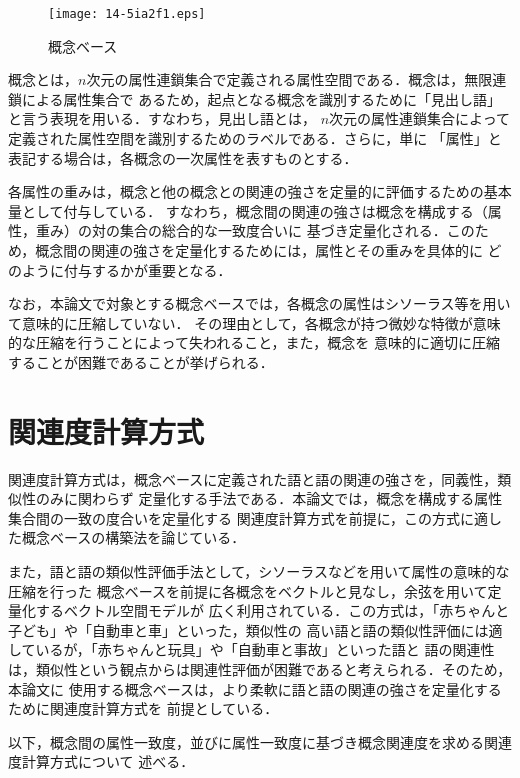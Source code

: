 \documentclass[japanese]{jnlp_1.3e}
\begin{document}
\begin{figure}[b]
	\begin{center}
	\texttt{[image: 14-5ia2f1.eps]}
	\caption{概念ベース}
	\label{fig:concept-base}
	\end{center}
\end{figure}

概念とは，$n$次元の属性連鎖集合で定義される属性空間である．概念は，無限連鎖による属性集合で
あるため，起点となる概念を識別するために「見出し語」と言う表現を用いる．すなわち，見出し語とは，
$n$次元の属性連鎖集合によって定義された属性空間を識別するためのラベルである．さらに，単に
「属性」と表記する場合は，各概念の一次属性を表すものとする．

各属性の重みは，概念と他の概念との関連の強さを定量的に評価するための基本量として付与している．
すなわち，概念間の関連の強さは概念を構成する（属性，重み）の対の集合の総合的な一致度合いに
基づき定量化される．このため，概念間の関連の強さを定量化するためには，属性とその重みを具体的に
どのように付与するかが重要となる．

なお，本論文で対象とする概念ベースでは，各概念の属性はシソーラス等を用いて意味的に圧縮していない．
その理由として，各概念が持つ微妙な特徴が意味的な圧縮を行うことによって失われること，また，概念を
意味的に適切に圧縮することが困難であることが挙げられる．


\section{関連度計算方式}

関連度計算方式\cite{watabe2006}は，概念ベースに定義された語と語の関連の強さを，同義性，類似性のみに関わらず
定量化する手法である．本論文では，概念を構成する属性集合間の一致の度合いを定量化する
関連度計算方式を前提に，この方式に適した概念ベースの構築法を論じている．

また，語と語の類似性評価手法として，シソーラスなどを用いて属性の意味的な圧縮を行った
概念ベースを前提に各概念をベクトルと見なし，余弦を用いて定量化するベクトル空間モデルが
広く利用されている\cite{Kawashima2005}．この方式は，「赤ちゃんと子ども」や「自動車と車」といった，類似性の
高い語と語の類似性評価には適しているが，「赤ちゃんと玩具」や「自動車と事故」といった語と
語の関連性は，類似性という観点からは関連性評価が困難であると考えられる．そのため，本論文に
使用する概念ベースは，より柔軟に語と語の関連の強さを定量化するために関連度計算方式を
前提としている．

以下，概念間の属性一致度，並びに属性一致度に基づき概念関連度を求める関連度計算方式について
述べる． 
\end{document}
